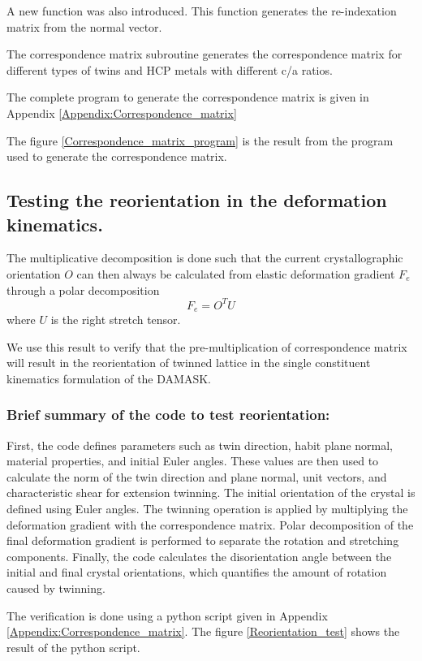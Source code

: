 A new function was also introduced. This function generates the re-indexation matrix from the normal vector.

The correspondence matrix subroutine generates the correspondence matrix for different types of twins and HCP metals with different c/a ratios.

The complete program to generate the correspondence matrix is given in Appendix \ref{Appendix:Correspondence_matrix}

The figure \ref{Correspondence_matrix_program} is the result from the program used to generate the correspondence matrix.


\subsection{Testing the reorientation in the deformation kinematics.}
The multiplicative decomposition is done such that the current crystallographic orientation $O$ can then always be calculated from elastic deformation gradient $F_e$ through a polar decomposition 
\begin{equation*}
    F_e = O^T U
\end{equation*}
 where $U$ is the right stretch tensor.

 We use this result to verify that the pre-multiplication of correspondence matrix will result in the reorientation of twinned lattice in the single constituent kinematics formulation of the DAMASK.
\subsubsection{Brief summary of the code to test reorientation:}
First, the code defines parameters such as twin direction, habit plane normal, material properties, and initial Euler angles. These values are then used to calculate the norm of the twin direction and plane normal, unit vectors, and characteristic shear for extension twinning. The initial orientation of the crystal is defined using Euler angles. The twinning operation is applied by multiplying the deformation gradient with the correspondence matrix. Polar decomposition of the final deformation gradient is performed to separate the rotation and stretching components. Finally, the code calculates the disorientation angle between the initial and final crystal orientations, which quantifies the amount of rotation caused by twinning.

 The verification is done using a python script given in Appendix \ref{Appendix:Correspondence_matrix}. The figure \ref{Reorientation_test} shows the result of the python script.

